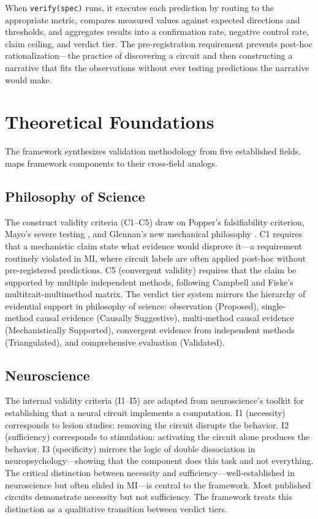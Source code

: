 \documentclass[10pt]{article}
\begin{document}
When \texttt{verify(spec)} runs, it executes each prediction by routing to the appropriate metric, compares measured values against expected directions and thresholds, and aggregates results into a confirmation rate, negative control rate, claim ceiling, and verdict tier. The pre-registration requirement prevents post-hoc rationalization---the practice of discovering a circuit and then constructing a narrative that fits the observations without ever testing predictions the narrative would make.

\section{Theoretical Foundations}
\label{sec:foundations}

The framework synthesizes validation methodology from five established fields.  maps framework components to their cross-field analogs.

\subsection{Philosophy of Science}

The construct validity criteria (C1--C5) draw on Popper's falsifiability criterion, Mayo's severe testing \citep{mayo2018statistical}, and Glennan's new mechanical philosophy \citep{glennan2017new}. C1 requires that a mechanistic claim state what evidence would disprove it---a requirement routinely violated in MI, where circuit labels are often applied post-hoc without pre-registered predictions. C5 (convergent validity) requires that the claim be supported by multiple independent methods, following Campbell and Fiske's multitrait-multimethod matrix. The verdict tier system mirrors the hierarchy of evidential support in philosophy of science: observation (Proposed), single-method causal evidence (Causally Suggestive), multi-method causal evidence (Mechanistically Supported), convergent evidence from independent methods (Triangulated), and comprehensive evaluation (Validated).

\subsection{Neuroscience}

The internal validity criteria (I1--I5) are adapted from neuroscience's toolkit for establishing that a neural circuit implements a computation. I1 (necessity) corresponds to lesion studies: removing the circuit disrupts the behavior. I2 (sufficiency) corresponds to stimulation: activating the circuit alone produces the behavior. I3 (specificity) mirrors the logic of double dissociation in neuropsychology---showing that the component does this task and not everything. The critical distinction between necessity and sufficiency---well-established in neuroscience but often elided in MI---is central to the framework. Most published circuits demonstrate necessity but not sufficiency. The framework treats this distinction as a qualitative transition between verdict tiers.
\end{document}
